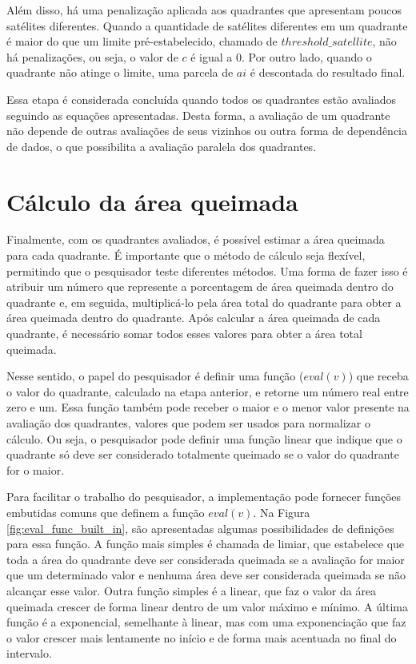 \documentclass[cic,tc]{iiufrgs}
\begin{document}
Além disso, há uma penalização aplicada aos quadrantes que apresentam poucos satélites diferentes. Quando a quantidade de satélites diferentes em um quadrante é maior do que um limite pré-estabelecido, chamado de $threshold\_satellite$, não há penalizações, ou seja, o valor de $c$ é igual a 0. Por outro lado, quando o quadrante não atinge o limite, uma parcela de $ai$ é descontada do resultado final. \par

Essa etapa é considerada concluída quando todos os quadrantes estão avaliados seguindo as equações apresentadas. Desta forma, a avaliação de um quadrante não depende de outras avaliações de seus vizinhos ou outra forma de dependência de dados, o que possibilita a avaliação paralela dos quadrantes. \par

\section{Cálculo da área queimada}

Finalmente, com os quadrantes avaliados, é possível estimar a área queimada para cada quadrante. É importante que o método de cálculo seja flexível, permitindo que o pesquisador teste diferentes métodos. Uma forma de fazer isso é atribuir um número que represente a porcentagem de área queimada dentro do quadrante e, em seguida, multiplicá-lo pela área total do quadrante para obter a área queimada dentro do quadrante. Após calcular a área queimada de cada quadrante, é necessário somar todos esses valores para obter a área total queimada. \par

Nesse sentido, o papel do pesquisador é definir uma função ($eval(v)$) que receba o valor do quadrante, calculado na etapa anterior, e retorne um número real entre zero e um. Essa função também pode receber o maior e o menor valor presente na avaliação dos quadrantes, valores que podem ser usados para normalizar o cálculo. Ou seja, o pesquisador pode definir uma função linear que indique que o quadrante só deve ser considerado totalmente queimado se o valor do quadrante for o maior.\par

Para facilitar o trabalho do pesquisador, a implementação pode fornecer funções embutidas comuns que definem a função $eval(v)$. Na Figura \ref{fig:eval_func_built_in}, são apresentadas algumas possibilidades de definições para essa função. A função mais simples é chamada de limiar, que estabelece que toda a área do quadrante deve ser considerada queimada se a avaliação for maior que um determinado valor e nenhuma área deve ser considerada queimada se não alcançar esse valor. Outra função simples é a linear, que faz o valor da área queimada crescer de forma linear dentro de um valor máximo e mínimo. A última função é a exponencial, semelhante à linear, mas com uma exponenciação que faz o valor crescer mais lentamente no início e de forma mais acentuada no final do intervalo. \par
\end{document}

